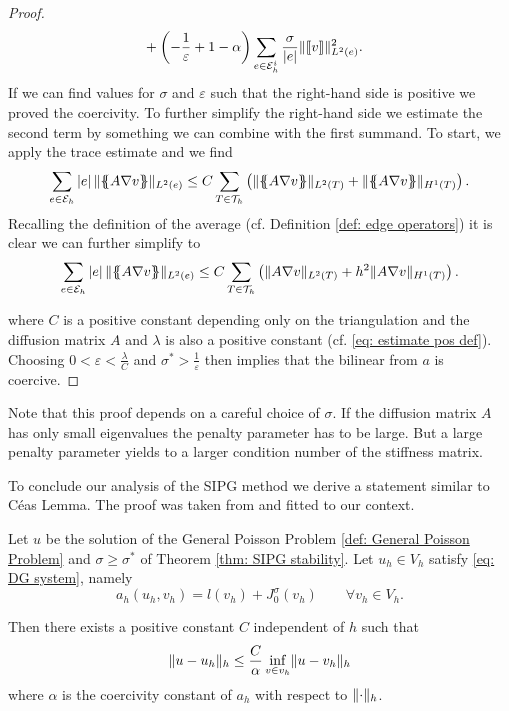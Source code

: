 \begin{proof}
\begin{align}
	 &+ \left(-\frac 1 \varepsilon +1-\alpha\right) \sum_{e\in \mathcal{E}_h^i}  \frac \sigma {|e|} \lVert \llbracket v \rrbracket \rVert_{L^2(e)}^2.
	\end{align}
	If we can find values for $\sigma$ and $\varepsilon$ such that the right-hand side is positive we proved the coercivity. To further simplify the right-hand side we estimate the second term by something we can combine with the first summand. To start, we apply the trace estimate and we find 
		\begin{align}
			\sum_{e \in \edges} \singleNorm e \LTwonormE{\average{A \nabla v}} 
			\leq C \sum_{T \in \triang} \left( \LTwonormT{\average{A \nabla v}} +\HOnenormT{\average{A \nabla v}}   \right).
		\end{align}
Recalling the definition of the average (cf. Definition \ref{def: edge operators}) it is clear we can further simplify to
		\begin{align}
			\sum_{e \in \mathcal{E}_h} \left| e \right| \lVert \{\!\!\{ A \nabla v \}\!\!\} \rVert_{L^2(e)} 
			\leq C \sum_{T \in \mathcal{T}_h} \left( \lVert A \nabla v \rVert_{L^2(T)} +h^2 \lVert  A \nabla v \rVert_{H^1(T)}   \right).
		\end{align}

	
	where $C$ is a positive constant depending only on the triangulation and the diffusion matrix $A$ and $\lambda$ is also a positive constant (cf. \eqref{eq: estimate pos def}).
	Choosing $0 < \varepsilon < \frac \lambda C$ and $\sigma^* > \frac 1 \varepsilon$ then implies that 
	the bilinear from $a$ is coercive. 
\end{proof}
Note that this proof depends on a careful choice of $\sigma$. If the diffusion matrix $A$ has only small eigenvalues the penalty parameter has to be large. But a large penalty parameter yields to a larger condition number of the stiffness matrix.

To conclude our analysis of the SIPG method we derive a statement similar to C\'eas Lemma. The proof was taken from \cite[Lemma 10.5.2]{BS2002} and fitted to our context.
\begin{theorem}\label{thm: error estimate}
	Let $u$ be the solution of the General Poisson Problem \ref{def: General Poisson Problem} and $\sigma \geq \sigma^*$ of Theorem \ref{thm: SIPG stability}. Let $u_h \in V_h$ satisfy \eqref{eq: DG system}, namely
	\[
		a_h(u_h, v_h) = l(v_h) + J^\sigma_0(v_h)  \qquad \forall v_h \in V_h.
	\]
\end{theorem}
Then there exists a positive constant $C$ independent of $h$ such that 
\[
	\lVert u - u_h  \rVert_{h} \leq \frac C \alpha \inf_{v \in v_h} \lVert u - v_h \rVert_{h}
\]
where $\alpha$ is the coercivity constant of $a_h$ with respect to $\lVert \cdot \rVert_{h}$.


